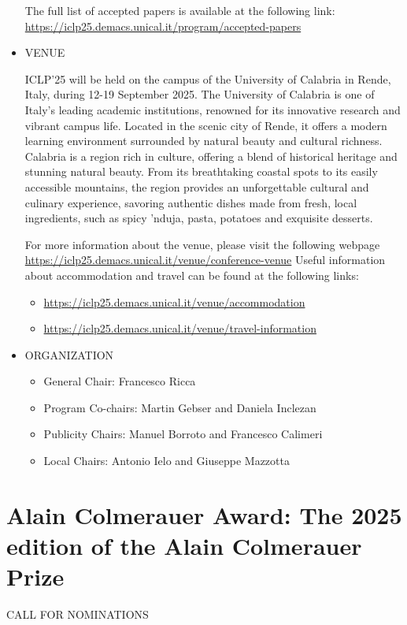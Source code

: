\documentclass[prodmode,acmtecs]{acmsmall} %
\begin{document}
\begin{itemize}
  The full list of accepted papers is available at the following link: \href{https://iclp25.demacs.unical.it/program/accepted-papers}{https://iclp25.demacs.unical.it/program/accepted-papers} 
 
\item  VENUE  
 
  ICLP’25 will be held on the campus of the University of Calabria in Rende, Italy, during 12-19 September 2025. The University of Calabria is one of Italy's leading academic institutions, renowned for its innovative research and vibrant campus life. Located in the scenic city of Rende, it offers a modern learning environment surrounded by natural beauty and cultural richness. Calabria is a region rich in culture, offering a blend of historical heritage and stunning natural beauty. From its breathtaking coastal spots to its easily accessible mountains, the region provides an unforgettable cultural and culinary experience, savoring authentic dishes made from fresh, local ingredients, such as spicy 'nduja, pasta, potatoes and exquisite desserts. 
 
  For more information about the venue, please visit the following webpage \href{https://iclp25.demacs.unical.it/venue/conference-venue}{https://iclp25.demacs.unical.it/venue/conference-venue}  Useful information about accommodation and travel can be found at the following links: 
 
\begin{itemize}\item  \href{https://iclp25.demacs.unical.it/venue/accommodation}{https://iclp25.demacs.unical.it/venue/accommodation}
\item  \href{https://iclp25.demacs.unical.it/venue/travel-information}{https://iclp25.demacs.unical.it/venue/travel-information}
\end{itemize} 
\item  ORGANIZATION 
 
\begin{itemize}\item  General Chair: Francesco Ricca
\item  Program Co-chairs: Martin Gebser and Daniela Inclezan
\item  Publicity Chairs: Manuel Borroto and Francesco Calimeri
\item  Local Chairs: Antonio Ielo and Giuseppe Mazzotta
\end{itemize} 
\end{itemize}\section{Alain Colmerauer Award: The 2025 edition of the Alain Colmerauer Prize}\label{AlainColmerauerAward}CALL FOR NOMINATIONS 
\end{document}
